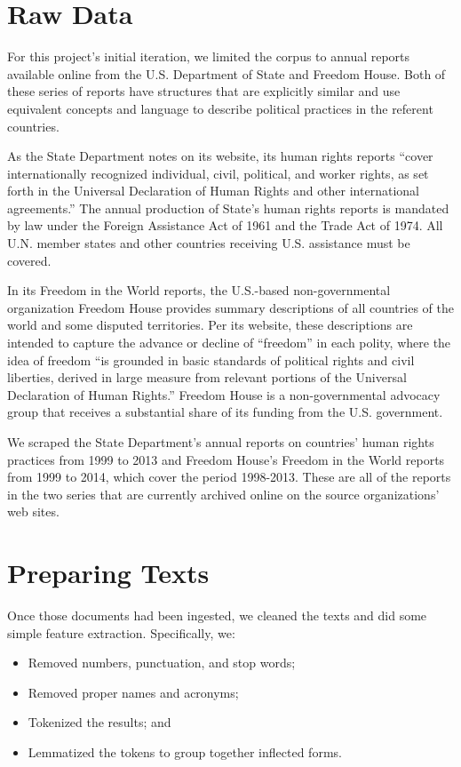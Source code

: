 \documentclass[pdftex,12pt,fullpage,oneside]{amsart}
\begin{document}
\section{Raw Data}

For this project's initial iteration, we limited the corpus to annual reports available online from the U.S. Department of State and Freedom House. Both of these series of reports have structures that are explicitly similar and use equivalent concepts and language to describe political practices in the referent countries.

As the State Department notes on its website, its human rights reports ``cover internationally recognized individual, civil, political, and worker rights, as set forth in the Universal Declaration of Human Rights and other international agreements.'' The annual production of State's human rights reports is mandated by law under the Foreign Assistance Act of 1961 and the Trade Act of 1974. All U.N. member states and other countries receiving U.S. assistance must be covered.

In its Freedom in the World reports, the U.S.-based non-governmental organization Freedom House provides summary descriptions of all countries of the world and some disputed territories. Per its website, these descriptions are intended to capture the advance or decline of ``freedom'' in each polity, where the idea of freedom ``is grounded in basic standards of political rights and civil liberties, derived in large measure from relevant portions of the Universal Declaration of Human Rights.'' Freedom House is a non-governmental advocacy group that receives a substantial share of its funding from the U.S. government.

We scraped the State Department's annual reports on countries' human rights practices from 1999 to 2013 and Freedom House's Freedom in the World reports from 1999 to 2014, which cover the period 1998-2013. These are all of the reports in the two series that are currently archived online on the source organizations' web sites.

\section{Preparing Texts}

Once those documents had been ingested, we cleaned the texts and did some simple feature extraction. Specifically, we:

\begin{itemize}
	\item Removed numbers, punctuation, and stop words;
	\item Removed proper names and acronyms;
	\item Tokenized the results; and
	\item Lemmatized the tokens to group together inflected forms.
\end{itemize}
\end{document}
